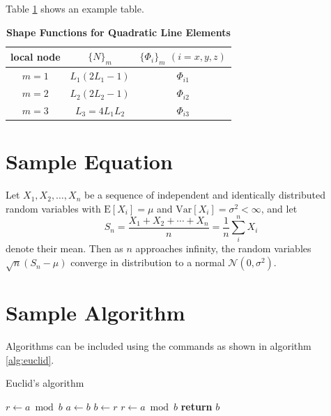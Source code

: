 \documentclass[9pt,twocolumn,twoside]{idsi}
\begin{document}
Table \ref{tab:shape-functions} shows an example table. 

\begin{table}[htbp]
\centering
\caption{\bf Shape Functions for Quadratic Line Elements}
\begin{tabular}{ccc}
\hline
local node & $\{N\}_m$ & $\{\Phi_i\}_m$ $(i=x,y,z)$ \\
\hline
$m = 1$ & $L_1(2L_1-1)$ & $\Phi_{i1}$ \\
$m = 2$ & $L_2(2L_2-1)$ & $\Phi_{i2}$ \\
$m = 3$ & $L_3=4L_1L_2$ & $\Phi_{i3}$ \\
\hline
\end{tabular}
  \label{tab:shape-functions}
\end{table}

\section{Sample Equation}

Let $X_1, X_2, \ldots, X_n$ be a sequence of independent and identically distributed random variables with $\text{E}[X_i] = \mu$ and $\text{Var}[X_i] = \sigma^2 < \infty$, and let
\begin{equation}
S_n = \frac{X_1 + X_2 + \cdots + X_n}{n}
      = \frac{1}{n}\sum_{i}^{n} X_i
\label{eq:refname1}
\end{equation}
denote their mean. Then as $n$ approaches infinity, the random variables $\sqrt{n}(S_n - \mu)$ converge in distribution to a normal $\mathcal{N}(0, \sigma^2)$.

\section{Sample Algorithm}

Algorithms can be included using the commands as shown in algorithm \ref{alg:euclid}.

\begin{algorithm}
\caption{Euclid’s algorithm}\label{alg:euclid}
\begin{algorithmic}[1]
\State $r\gets a\bmod b$
\State $a\gets b$
\State $b\gets r$
\State $r\gets a\bmod b$
\EndWhile\label{euclidendwhile}
\State \textbf{return} $b$
\EndProcedure
\end{algorithmic}
\end{algorithm}
\end{document}
